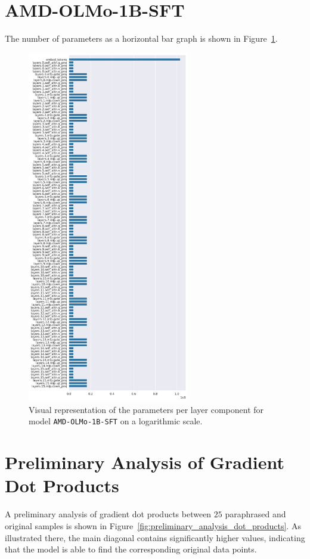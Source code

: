\section{AMD-OLMo-1B-SFT}
The number of parameters as a horizontal bar graph is shown in Figure~\ref{fig:parameters_per_layer_amd_olmo}.
\begin{figure}[ht]
    \centering
    \includegraphics[width=0.63\textwidth]{figures/parameters_per_layer.png}
    \caption{Visual representation of the parameters per layer component for model \texttt{AMD-OLMo-1B-SFT} on a logarithmic scale.}
    \label{fig:parameters_per_layer_amd_olmo}
\end{figure}

\section{Preliminary Analysis of Gradient Dot Products}
A preliminary analysis of gradient dot products between $25$ paraphrased and original samples is shown in Figure~\ref{fig:preliminary_analysis_dot_products}. As illustrated there, the main diagonal contains significantly higher values, indicating that the model is able to find the corresponding original data points. 

